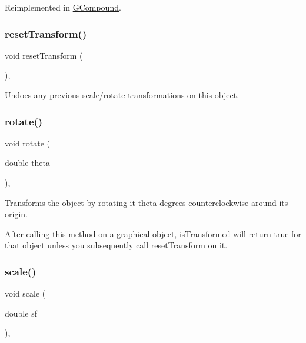 Reimplemented in \mbox{\hyperlink{classsgl_1_1GCompound_afb8dbc55702230f0030e47d6c009697f}{G\+Compound}}.

\mbox{\label{classsgl_1_1GObject_a6022a1fd1e5dcd2fd5585e5a36aa3f37}} 
\subsubsection{\texorpdfstring{reset\+Transform()}{resetTransform()}}
{\footnotesize\ttfamily void reset\+Transform (\begin{DoxyParamCaption}{ }\end{DoxyParamCaption})\hspace{0.3cm}{\ttfamily [virtual]}, {\ttfamily [inherited]}}



Undoes any previous scale/rotate transformations on this object. 

\mbox{\label{classsgl_1_1GObject_ae1ffaa12185dfd5ba464f7d87c329e26}} 
\subsubsection{\texorpdfstring{rotate()}{rotate()}}
{\footnotesize\ttfamily void rotate (\begin{DoxyParamCaption}\item[{double}]{theta }\end{DoxyParamCaption})\hspace{0.3cm}{\ttfamily [virtual]}, {\ttfamily [inherited]}}



Transforms the object by rotating it {\ttfamily theta} degrees counterclockwise around its origin. 

After calling this method on a graphical object, {\ttfamily is\+Transformed} will return {\ttfamily true} for that object unless you subsequently call {\ttfamily reset\+Transform} on it. \mbox{\label{classsgl_1_1GObject_ad2e1900f730475c2d044817db03b38d6}} 
\subsubsection{\texorpdfstring{scale()}{scale()}\hspace{0.1cm}{\footnotesize\ttfamily [1/2]}}
{\footnotesize\ttfamily void scale (\begin{DoxyParamCaption}\item[{double}]{sf }\end{DoxyParamCaption})\hspace{0.3cm}{\ttfamily [virtual]}, {\ttfamily [inherited]}}



